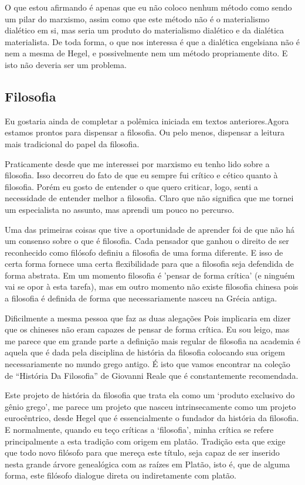O que estou afirmando é apenas que eu não coloco nenhum método como sendo um pilar do marxismo, assim como que este método não é o materialismo dialético em si, mas seria um produto do materialismo dialético e da dialética materialista. De toda forma, o que nos interessa é que a dialética engelsiana não é nem a mesma de Hegel, e possivelmente nem um método propriamente dito. E isto não deveria ser um problema.


\subsection{Filosofia}

Eu gostaria ainda de completar a polêmica iniciada em textos anteriores.Agora estamos prontos para dispensar a filosofia. Ou pelo menos, dispensar a leitura mais tradicional do papel da filosofia.

Praticamente desde que me interessei por marxismo eu tenho lido sobre a filosofia. Isso decorreu do fato de que eu sempre fui crítico e cético quanto à filosofia. Porém eu gosto de entender o que quero criticar, logo, senti a necessidade de entender melhor a filosofia. Claro que não significa que me tornei um especialista no assunto, mas aprendi um pouco no percurso.

Uma das primeiras coisas que tive a oportunidade de aprender foi de que não há um consenso sobre o que é filosofia\cite{glauber1}. Cada pensador que ganhou o direito de ser reconhecido como filósofo definiu a filosofia de uma forma diferente. E isso de certa forma fornece uma certa flexibilidade para que a filosofia seja defendida de forma abstrata. Em um momento filosofia é 'pensar de forma crítica' (e ninguém vai se opor à esta tarefa), mas em outro momento não existe filosofia chinesa pois a filosofia é definida de forma que necessariamente nasceu na Grécia antiga. 

Dificilmente a mesma pessoa que faz as duas alegações Pois implicaria em dizer que os chineses não eram capazes de pensar de forma crítica. Eu sou leigo, mas me parece que em grande parte a definição mais regular de filosofia na academia é aquela que é dada pela disciplina de história da filosofia colocando sua origem necessariamente no mundo grego antigo. É isto que vamos encontrar na coleção de “História Da Filosofia” de Giovanni Reale que é constantemente recomendada.

Este projeto de história da filosofia que trata ela como um ‘produto exclusivo do gênio grego’, me parece um projeto que nasceu intrinsecamente como um projeto eurocêntrico, desde Hegel que é essencialmente o fundador da história da filosofia\cite{usphegel}. E normalmente, quando eu teço críticas a ‘filosofia’, minha crítica se refere principalmente a esta tradição com origem em platão. Tradição esta que exige que todo novo filósofo para que mereça este título, seja capaz de ser inserido nesta grande árvore genealógica com as raízes em Platão, isto é, que de alguma forma, este filósofo dialogue direta ou indiretamente com platão.

